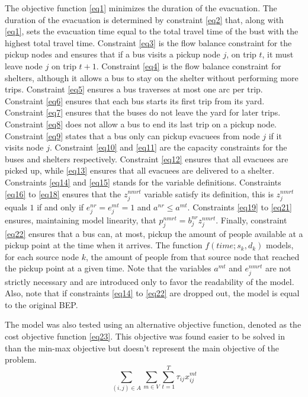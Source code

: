 \documentclass[conference]{IEEEtran}
\begin{document}
The objective function \eqref{eq1} minimizes the duration of the evacuation. The duration of the evacuation is determined by constraint \eqref{eq2} that, along with \eqref{eq1}, sets the evacuation time equal to the total travel time of the bust with the highest total travel time. Constraint \eqref{eq3} is the flow balance constraint for the pickup nodes and ensures that if a bus visits a pickup node $j$, on trip $t$, it must leave node $j$ on trip $t + 1$. Constraint \eqref{eq4} is the flow balance constraint for shelters, although it allows a bus to stay on the shelter without performing more trips. Constraint \eqref{eq5} ensures a bus traverses at most one arc per trip. Constraint \eqref{eq6} ensures that each bus starts its first trip from its yard. Constraint \eqref{eq7} ensures that the buses do not leave the yard for later trips. Constraint \eqref{eq8} does not allow a bus to end its last trip on a pickup node. Constraint \eqref{eq9} states that a bus only can pickup evacuees from node $j$ if it visits node $j$. Constraint \eqref{eq10} and \eqref{eq11} are the capacity constraints for the buses and shelters respectively. Constraint \eqref{eq12} ensures that all evacuees are picked up, while \eqref{eq13} ensures that all evacuees are delivered to a shelter. Constraints \eqref{eq14} and \eqref{eq15} stands for the variable definitions. Constraints \eqref{eq16} to \eqref{eq18} ensures that the $z_{j}^{nmrt}$ variable satisfy its definition, this is $z_{j}^{nmrt}$ equals $1$ if and only if $e_{j}^{nr}=e_{j}^{mt}=1$ and $a^{nr}\leq a^{mt}$. Constraints \eqref{eq19} to \eqref{eq21} ensures, maintaining model linearity, that $p_{j}^{nmrt} = b_{j}^{nr} z_{j}^{nmrt}$. Finally, constraint \eqref{eq22} ensures that a bus can, at most, pickup the amount of people available at a pickup point at the time when it arrives. The function $f(time;s_{k}, d_{k})$ models, for each source node $k$, the amount of people from that source node that reached the pickup point at a given time. Note that the variables $a^{mt}$ and $e_{j}^{nmrt}$ are not strictly necessary and are introduced only to favor the readability of the model. Also, note that if constraints \eqref{eq14} to \eqref{eq22} are dropped out, the model is equal to the original BEP.

The model was also tested using an alternative objective function, denoted as the cost objective function \eqref{eq23}. This objective was found easier to be solved in \cite{b1} than the min-max objective but doesn't represent the main objective of the problem.
\begin{equation}
    \sum_{(i, j) \in A}\sum_{m \in V}\sum_{t=1}^{T} \tau_{ij}x_{ij}^{mt}
    \label{eq23}
\end{equation}
\end{document}
